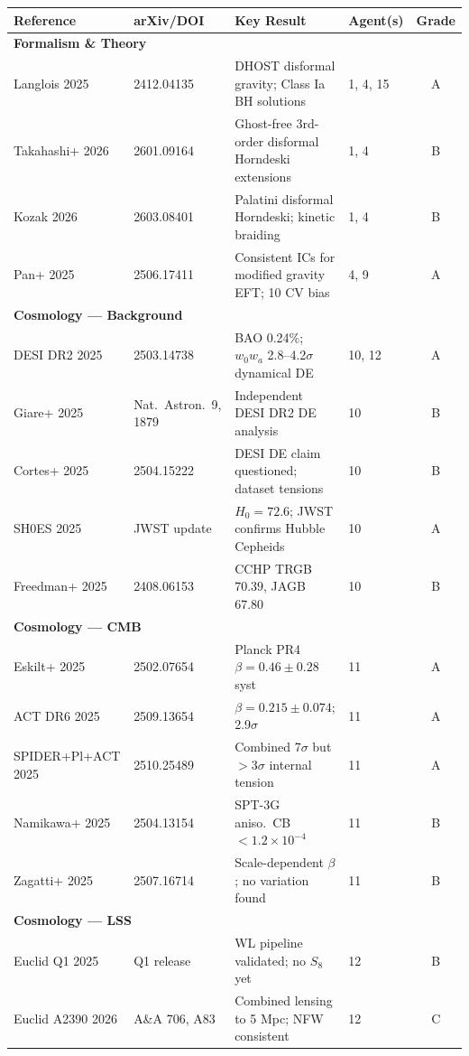 \documentclass[11pt,a4paper]{article}
\begin{document}
\begin{longtable}{p{2.5cm}p{2.5cm}p{4.5cm}p{1.5cm}c}
\toprule
\textbf{Reference} & \textbf{arXiv/DOI} & \textbf{Key Result} & \textbf{Agent(s)} & \textbf{Grade} \\
\midrule
\endhead

\multicolumn{5}{l}{\textbf{Formalism \& Theory}} \\
\midrule
Langlois 2025 & 2412.04135 & DHOST disformal gravity; Class Ia BH solutions & 1, 4, 15 & A \\
Takahashi+ 2026 & 2601.09164 & Ghost-free 3rd-order disformal Horndeski extensions & 1, 4 & B \\
Kozak 2026 & 2603.08401 & Palatini disformal Horndeski; kinetic braiding & 1, 4 & B \\
Pan+ 2025 & 2506.17411 & Consistent ICs for modified gravity EFT; 10 CV bias & 4, 9 & A \\
\midrule

\multicolumn{5}{l}{\textbf{Cosmology --- Background}} \\
\midrule
DESI DR2 2025 & 2503.14738 & BAO 0.24\%; $w_0w_a$ 2.8--4.2$\sigma$ dynamical DE & 10, 12 & A \\
Giare+ 2025 & Nat.\ Astron.\ 9, 1879 & Independent DESI DR2 DE analysis & 10 & B \\
Cortes+ 2025 & 2504.15222 & DESI DE claim questioned; dataset tensions & 10 & B \\
SH0ES 2025 & JWST update & $H_0 = 72.6$; JWST confirms Hubble Cepheids & 10 & A \\
Freedman+ 2025 & 2408.06153 & CCHP TRGB $70.39$, JAGB $67.80$ & 10 & B \\
\midrule

\multicolumn{5}{l}{\textbf{Cosmology --- CMB}} \\
\midrule
Eskilt+ 2025 & 2502.07654 & Planck PR4 $\beta = 0.46 \pm 0.28$ syst & 11 & A \\
ACT DR6 2025 & 2509.13654 & $\beta = 0.215 \pm 0.074$; 2.9$\sigma$ & 11 & A \\
SPIDER+Pl+ACT 2025 & 2510.25489 & Combined 7$\sigma$ but $>$3$\sigma$ internal tension & 11 & A \\
Namikawa+ 2025 & 2504.13154 & SPT-3G aniso.\ CB $< 1.2\times10^{-4}$ & 11 & B \\
Zagatti+ 2025 & 2507.16714 & Scale-dependent $\beta$; no variation found & 11 & B \\
\midrule

\multicolumn{5}{l}{\textbf{Cosmology --- LSS}} \\
\midrule
Euclid Q1 2025 & Q1 release & WL pipeline validated; no $S_8$ yet & 12 & B \\
Euclid A2390 2026 & A\&A 706, A83 & Combined lensing to 5 Mpc; NFW consistent & 12 & C \\
\midrule


\end{longtable}
\end{document}
